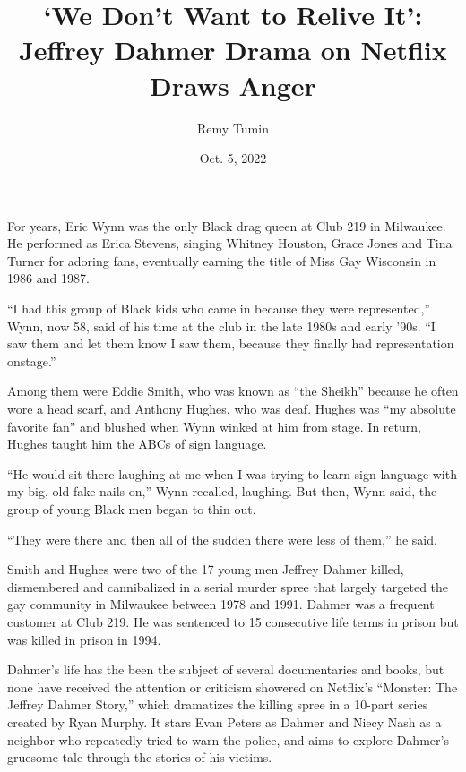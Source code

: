 \documentclass[10pt,a4paper]{article}
\begin{document}
\title{‘We Don’t Want to Relive It’: Jeffrey Dahmer Drama on Netflix Draws Anger}
\date{Oct. 5, 2022}
\author{Remy Tumin}


\maketitle
    
\noindent\linenumbers For years, Eric Wynn was the only Black drag queen at Club 219 in Milwaukee. He performed as Erica Stevens, singing Whitney Houston, Grace Jones and Tina Turner for adoring fans, eventually earning the title of Miss Gay Wisconsin in 1986 and 1987.

“I had this group of Black kids who came in because they were represented,” Wynn, now 58, said of his time at the club in the late 1980s and early ’90s. “I saw them and let them know I saw them, because they finally had representation onstage.”

Among them were Eddie Smith, who was known as “the Sheikh” because he often wore a head scarf, and Anthony Hughes, who was deaf. Hughes was “my absolute favorite fan” and blushed when Wynn winked at him from stage. In return, Hughes taught him the ABCs of sign language.

“He would sit there laughing at me when I was trying to learn sign language with my big, old fake nails on,” Wynn recalled, laughing.
But then, Wynn said, the group of young Black men began to thin out.

“They were there and then all of the sudden there were less of them,” he said.

Smith and Hughes were two of the 17 young men Jeffrey Dahmer killed, dismembered and cannibalized in a serial murder spree that largely targeted the gay community in Milwaukee between 1978 and 1991. Dahmer was a frequent customer at Club 219. He was sentenced to 15 consecutive life terms in prison but was killed in prison in 1994.

Dahmer’s life has the been the subject of several documentaries and books, but none have received the attention or criticism showered on Netflix’s “Monster: The Jeffrey Dahmer Story,” which dramatizes the killing spree in a 10-part series created by Ryan Murphy. It stars Evan Peters as Dahmer and Niecy Nash as a neighbor who repeatedly tried to warn the police, and aims to explore Dahmer’s gruesome tale through the stories of his victims.
\end{document}
